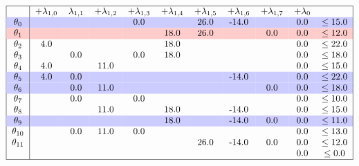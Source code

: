 \documentclass{article}
\begin{document}
    \[
        \begin{tabular}{ |c|c c c c c c c c c c| }
            \hline
            & +$\lambda_{1,0}$ & $\lambda_{1,1}$ & +$\lambda_{1,2}$ & +$\lambda_{1,3}$ & +$\lambda_{1,4}$ & +$\lambda_{1,5}$ & +$\lambda_{1,6}$ & +$\lambda_{1,7}$  & +$\lambda_{0}$ &  \\
            \rowcolor{blue!20}
            $\theta_{0}$ && & & 0.0 && 26.0 &-14.0 && 0.0& $\leq 15.0$ \\
            \rowcolor{red!20}
            $\theta_{1}$ && & & & 18.0 &26.0 && 0.0 &0.0& $\leq 12.0$ \\
            $\theta_{2}$ &4.0 && & & 18.0 && & & 0.0& $\leq 22.0$ \\
            $\theta_{3}$ && 0.0 && 0.0 &18.0 && & & 0.0& $\leq 18.0$ \\
            $\theta_{4}$ &4.0 && 11.0 && & & & & 0.0& $\leq 15.0$ \\
            \rowcolor{blue!20}
            $\theta_{5}$ &4.0 &0.0 && & & & -14.0 && 0.0& $\leq 22.0$ \\
            \rowcolor{blue!20}
            $\theta_{6}$ && 0.0 &11.0 && & & & 0.0 &0.0& $\leq 18.0$ \\
            $\theta_{7}$ && 0.0 && 0.0 && & & & 0.0& $\leq 10.0$ \\
            $\theta_{8}$ && & 11.0 && 18.0 && -14.0 && 0.0& $\leq 15.0$ \\
            \rowcolor{blue!20}
            $\theta_{9}$ && & & & 18.0 && -14.0 &0.0 &0.0& $\leq 11.0$ \\
            $\theta_{10}$ && 0.0 &11.0 &0.0 && & & & 0.0& $\leq 13.0$ \\
            $\theta_{11}$ && & & & & 26.0 &-14.0 &0.0 &0.0& $\leq 12.0$ \\
            && & & & &  && & 0.0 & $\leq 0.0$ \\
            \hline
        \end{tabular}
    \]
\end{document}
